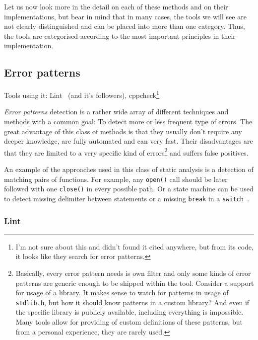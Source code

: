 Let us now look more in the detail on each of these methods and on their implementations, but bear in mind that in many cases, the tools we will see are not clearly distinguished and can be placed into more than one category. Thus, the tools are categorised according to the most important principles in their implementation.

\subsection{Error patterns}

Tools using it: Lint~\cite{KrenaVojnarOverview} (and it's followers), cppcheck\footnote{I'm not sure about this and didn't found it cited anywhere, but from its code, it looks like they search for error patterns.}

{\em Error patterns} detection is a rather wide array of different techniques and methods with a common goal: To detect more or less frequent type of errors. The great advantage of this class of methods is that they usually don't require any deeper knowledge, are fully automated and can very fast. Their disadvantages are that they are limited to a very specific kind of errors\footnote{Basically, every error pattern needs is own filter and only some kinds of error patterns are generic enough to be shipped within the tool. Consider a support for usage of a library. It makes sense to watch for patterns in usage of {\tt stdlib.h}, but how it should know patterns in a custom library? And even if the specific library is publicly available, including everything is impossible. Many tools allow for providing of custom definitions of these patterns, but from a personal experience, they are rarely used.} and suffers false positives.

An example of the approaches used in this class of static analysis is a detection of matching pairs of functions. For example, any {\tt open()} call should be later followed with one {\tt close()} in every possible path. Or a state machine can be used to detect missing delimiter between statements or a missing {\tt break} in a {\tt switch}~\cite{dynamine}.

\subsubsection{Lint}

